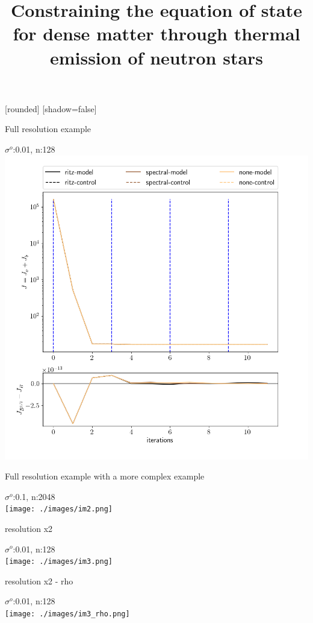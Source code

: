 \documentclass[francais]{beamer}
\title[Nicolas Baillot d'Etivaux]{Constraining the equation of state for dense matter through thermal emission of neutron stars}
\begin{document}
[rounded]%
[shadow=false]




\begin{frame}{Full resolution example}
\begin{center}
$\sigma^o$:0.01, n:128\\
 \includegraphics[scale=0.3]{./images/im1.png}
\end{center}
\end{frame}

\begin{frame}{Full resolution example with a more complex example}
\begin{center}
$\sigma^o$:0.1, n:2048\\
 \texttt{[image: ./images/im2.png]}
\end{center}
\end{frame}


\begin{frame}{resolution x2}
\begin{center}
$\sigma^o$:0.01, n:128\\
 \texttt{[image: ./images/im3.png]}
\end{center}
\end{frame}


\begin{frame}{resolution x2 - rho}
\begin{center}
$\sigma^o$:0.01, n:128\\
 \texttt{[image: ./images/im3\_rho.png]}
\end{center}
\end{frame}
\end{document}

